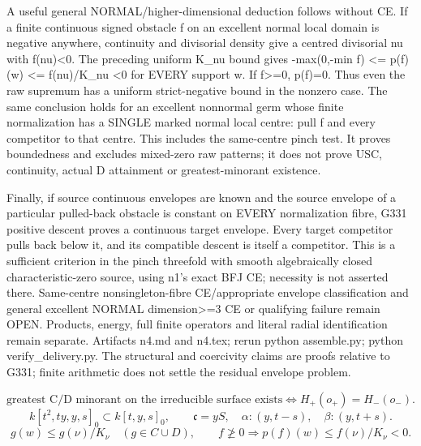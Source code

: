 A useful general NORMAL/higher-dimensional deduction follows without CE. If a finite continuous signed obstacle f on an excellent normal local domain is negative anywhere, continuity and divisorial density give a centred divisorial nu with f(nu)\textless{}0. The preceding uniform K\_nu bound gives
-max(0,-min f) \textless{}= p(f)(w) \textless{}= f(nu)/K\_nu \textless{}0 for EVERY support w.
If f\textgreater{}=0, p(f)=0. Thus even the raw supremum has a uniform strict-negative bound in the nonzero case. The same conclusion holds for an excellent nonnormal germ whose finite normalization has a SINGLE marked normal local centre: pull f and every competitor to that centre. This includes the same-centre pinch test. It proves boundedness and excludes mixed-zero raw patterns; it does not prove USC, continuity, actual D attainment or greatest-minorant existence.

Finally, if source continuous envelopes are known and the source envelope of a particular pulled-back obstacle is constant on EVERY normalization fibre, G331 positive descent proves a continuous target envelope. Every target competitor pulls back below it, and its compatible descent is itself a competitor. This is a sufficient criterion in the pinch threefold with smooth algebraically closed characteristic-zero source, using n1's exact BFJ CE; necessity is not asserted there. Same-centre nonsingleton-fibre CE/appropriate envelope classification and general excellent NORMAL dimension\textgreater{}=3 CE or qualifying failure remain OPEN. Products, energy, full finite operators and literal radial identification remain separate. Artifacts n4.md and n4.tex; rerun python assemble.py; python verify\_delivery.py. The structural and coercivity claims are proofs relative to G331; finite arithmetic does not settle the residual envelope problem.

\[
 \text{greatest C/D minorant on the irreducible surface exists}
 \Longleftrightarrow H_+(o_+)=H_-(o_-).
\]
\[
 k[t^2,ty,y,s]_0\subset k[t,y,s]_0,\qquad
 \mathfrak c=yS,\quad \alpha:(y,t-s),\quad\beta:(y,t+s).
\]
\[
 g(w)\le g(\nu)/K_\nu\quad(g\in C\cup D),\qquad
 f\not\ge0\Longrightarrow p(f)(w)\le f(\nu)/K_\nu<0.
\]

